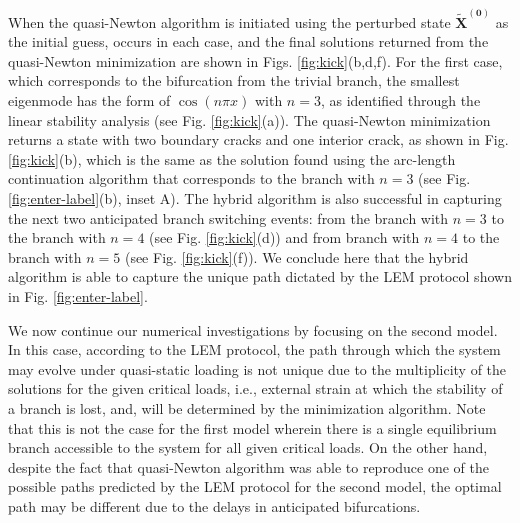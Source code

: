 When the quasi-Newton algorithm is initiated using the perturbed state \(\mathbf{\tilde X^{(0)}}\)
as the initial guess,  occurs in each case, and the final solutions returned from the quasi-Newton minimization are shown in Figs. \ref{fig:kick}(b,d,f). For the first case, which corresponds to the bifurcation from the trivial branch, the smallest eigenmode has the form of \(\cos(n\pi x)\) with \(n=3\), as identified through the linear stability analysis (see Fig. \ref{fig:kick}(a)). The quasi-Newton minimization returns a state with two boundary cracks and one interior crack, as shown in Fig. \ref{fig:kick}(b), which is the same as the solution found using the arc-length continuation algorithm that corresponds to the branch with \(n=3\) (see Fig. \ref{fig:enter-label}(b), inset A).  The hybrid algorithm is also successful in capturing the next two  anticipated branch   switching events: from the  branch with \(n=3\)  to the branch  with \(n=4\) (see Fig. \ref{fig:kick}(d)) and  from branch with \(n=4\)  to the branch  with \(n=5\) (see Fig. \ref{fig:kick}(f)).   We  conclude here that the hybrid algorithm is able to capture the unique path dictated by the LEM protocol shown in Fig. \ref{fig:enter-label}.   

We now continue our numerical investigations by focusing on the second model. In this case, according to the LEM protocol, the path through which the system may evolve under quasi-static loading is not unique due to the multiplicity of the solutions for  the given critical loads, i.e., external strain at which the stability of a branch is lost,  and, will be determined by the minimization algorithm.
Note that this is not the case for the first model wherein there is a single equilibrium branch accessible to the system for all given critical loads.
On the other hand, despite the fact that quasi-Newton algorithm was able to reproduce one of the possible paths predicted by the LEM protocol for the second model, the optimal path  may be different due to the delays in anticipated bifurcations. 


